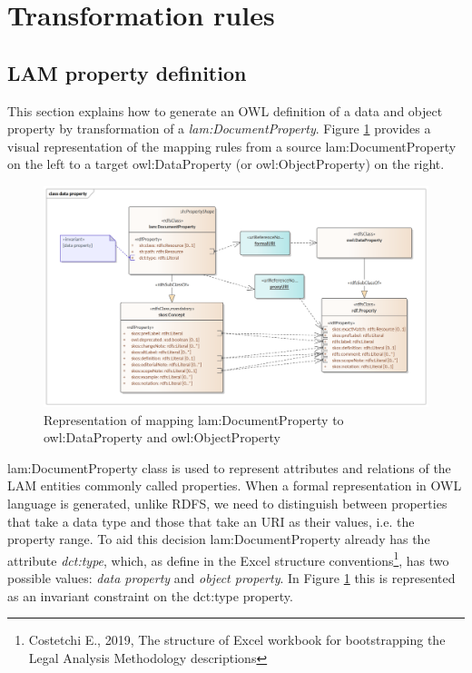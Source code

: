 \section{Transformation rules}\label{tr}





\subsection{LAM property definition}

	This section explains how to generate an OWL definition of a data and object property by transformation of a \textit{lam:DocumentProperty}. Figure \ref{fig:mapping-property-data} provides a visual representation of the mapping rules from a source lam:DocumentProperty on the left to a target owl:DataProperty (or owl:ObjectProperty) on the right.
	
	\begin{figure}[h]
		\centering
		\includegraphics[width=15cm]{images/data-property.png}
		\caption{Representation of mapping lam:DocumentProperty to owl:DataProperty and owl:ObjectProperty}
		\label{fig:mapping-property-data}
	\end{figure}

	lam:DocumentProperty class is used to represent attributes and relations of the LAM entities commonly called properties. When a formal representation in OWL language is generated, unlike RDFS, we need to distinguish between properties that take a data type and those that take an URI as their values, i.e. the property range. To aid this decision lam:DocumentProperty already has the attribute \textit{dct:type}, which, as define in the Excel structure conventions\footnote {Costetchi E., 2019, The structure of Excel workbook for bootstrapping the Legal Analysis Methodology descriptions}, has two possible values: \textit{data property} and \textit{object property}. 
	In Figure \ref{fig:mapping-property-data} this is represented as an invariant constraint on the dct:type property. 
	
